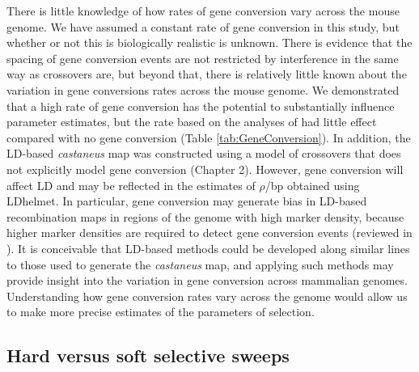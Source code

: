 {	There is little knowledge of how rates of gene conversion vary across the mouse genome. We have assumed a constant rate of gene conversion in this study, but whether or not this is biologically realistic is unknown. There is evidence that the spacing of gene conversion events are not restricted by interference in the same way as crossovers are, but beyond that, there is relatively little known about the variation in gene conversions rates across the mouse genome. We demonstrated that a high rate of gene conversion has the potential to substantially influence parameter estimates, but the rate based on the analyses of \cite{RN263} had little effect compared with no gene conversion (Table \ref{tab:GeneConversion}). In addition, the LD-based \textit{castaneus} map was constructed using a model of crossovers that does not explicitly model gene conversion (Chapter 2). However, gene conversion will affect LD and may be reflected in the estimates of $\rho$/bp obtained using LDhelmet. In particular, gene conversion may generate bias in LD-based recombination maps in regions of the genome with high marker density, because higher marker densities are required to detect gene conversion events (reviewed in \citealt{RN394}). It is conceivable that LD-based methods could be developed along similar lines to those used to generate the \textit{castaneus} map, and applying such methods may provide insight into the variation in gene conversion across mammalian genomes. Understanding how gene conversion rates vary across the genome would allow us to make more precise estimates of the parameters of selection.

\subsection{Hard versus soft selective sweeps}

}
